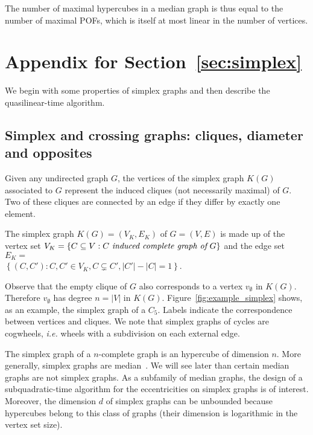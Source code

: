 \documentclass[a4paper,UKenglish,numberwithinsect,cleveref, autoref,anonymous]{lipics-v2021}
\newcommand{\set}[1]{\left\{ #1 \right\}}
\newcommand{\card}[1]{\left| #1 \right|}
\begin{document}
The number of maximal hypercubes in a median graph is thus equal to the number of maximal POFs, which is itself at most linear in the number of vertices.

\section{Appendix for Section~\ref{sec:simplex}} \label{asec:simplex}

We begin with some properties of simplex graphs and then describe the quasilinear-time algorithm.

\subsection{Simplex and crossing graphs: cliques, diameter and opposites} \label{subsec:crossing}

Given any undirected graph $G$, the vertices of the simplex graph $K(G)$ associated to $G$ represent the induced cliques (not necessarily maximal) of $G$. Two of these cliques are connected by an edge if they differ by exactly one element.

\begin{definition}
The simplex graph $K(G)=(V_K,E_K)$ of $G=(V,E)$ is made up of the vertex set $V_K = \set{C\subseteq V: C ~\emph{induced complete graph of}~ G}$ and the edge set $E_K = $\\ $\set{(C,C') : C,C' \in V_K, C \subsetneq C', \card{C'}-\card{C} = 1}$.
\label{def:simplex}
\end{definition}

Observe that the empty clique of $G$ also corresponds to a vertex $v_{\emptyset}$ in $K(G)$.  Therefore $v_{\emptyset}$ has degree $n = \card{V}$ in $K(G)$. Figure~\ref{fig:example_simplex} shows, as an example, the simplex graph of a $C_5$. Labels indicate the correspondence between vertices and cliques. We note that simplex graphs of cycles are cogwheels, {\em i.e.} wheels with a subdivision on each external edge.

The simplex graph of a $n$-complete graph is an hypercube of dimension $n$. More generally, simplex graphs are median~\cite{BaCh08,BaLeMo86}. We will see later than certain median graphs are not simplex graphs. As a subfamily of median graphs, the design of a subquadratic-time algorithm for the eccentricities on simplex graphs is of interest. Moreover, the dimension $d$ of simplex graphs can be unbounded because hypercubes belong to this class of graphs (their dimension is logarithmic in the vertex set size).
\end{document}

